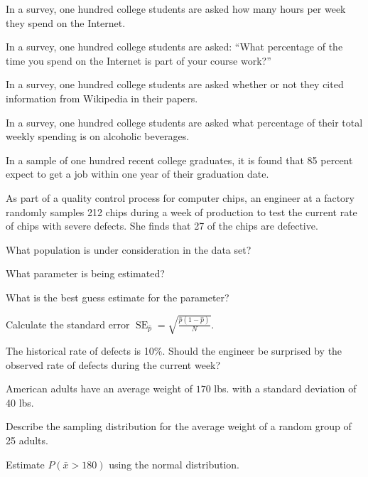 \documentclass[12pt]{exam}
\newcounter{countA}
\begin{document}
\begin{questions}
  \begin{parts}
  \item
    In a survey, one hundred college students are asked how many hours
    per week they spend on the Internet.
\vfill
  \item
    In a survey, one hundred college students are asked: ``What
    percentage of the time you spend on the Internet is part of your
    course work?''
\vfill
  \item
    In a survey, one hundred college students are asked whether or not
    they cited information from Wikipedia in their papers.
\vfill
  \item
    In a survey, one hundred college students are asked what percentage
    of their total weekly spending is on alcoholic beverages.
\vfill
  \item
    In a sample of one hundred recent college graduates, it is found
    that 85 percent expect to get a job within one year of their
    graduation date.
\vfill
  \end{parts}
\newpage
\item
  As part of a quality control process for computer chips, an engineer
  at a factory randomly samples 212 chips during a week of production to
  test the current rate of chips with severe defects. She finds that 27
  of the chips are defective.

  \begin{parts}
  \item
    What population is under consideration in the data set?
\vfill
  \item
    What parameter is being estimated?
\vfill
  \item
    What is the best guess estimate for the parameter?
\vfill
  \item
    Calculate the standard error $\displaystyle \operatorname{SE}_{\hat{p}} = \sqrt{\frac{\hat{p}(1-\hat{p})}{N}}.$
\vfill
  \item
    The historical rate of defects is 10\%. Should the engineer be
    surprised by the observed rate of defects during the current week?
\vfill
  \end{parts}
\item
  American adults have an average weight of \(170\) lbs. with a standard
  deviation of 40 lbs.

  \begin{parts}
  \item
    Describe the sampling distribution for the average weight of a
    random group of 25 adults.
\vfill
  \item
    Estimate \(P(\bar{x} > 180)\) using the normal distribution.
\vfill
  \end{parts}

\setcounter{countA}{\value{question}}
\end{questions}
\end{document}
